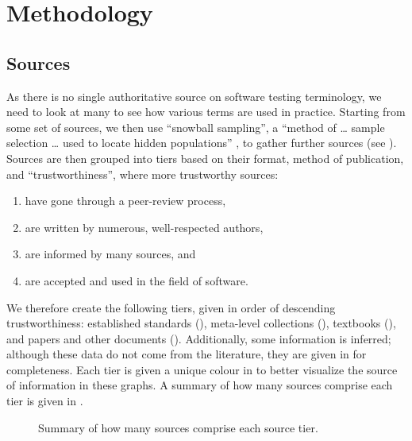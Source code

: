 \section{Methodology}
\label{methodology}

\subsection{Sources}
\label{sources}
As there is no single authoritative source on software testing terminology,
we need to look at many to see how various terms are used in practice.
Starting from some set of sources, we then use
``snowball sampling'', a ``method of \dots{} sample selection \dots{} used to
locate hidden populations'' \citep{Johnson2014}, to gather further sources
(see ). Sources are then grouped into tiers based on their
format, method of publication, and ``trustworthiness'', where more trustworthy
sources:
\begin{enumerate}
    \item have gone through a peer-review process,
    \item are written by numerous, well-respected authors,
    \item are informed by many sources, and
    \item are accepted and used in the field of software.
\end{enumerate}

We therefore create the following tiers, given in order of descending
trustworthiness: established standards (), meta-level
collections (), textbooks (), and papers and other
documents (). \ifnotpaper
    Additionally, some information is inferred; although these data do not come
    from the literature, they are given in  for completeness.
\fi Each tier is given a unique colour in  to better visualize the source of information in these
graphs. A summary of how many sources comprise each tier is given in
.

\begin{figure}
    \centering
    \caption{Summary of how many sources comprise each source tier.}
    \label{fig:sourceSummary}
\end{figure}

